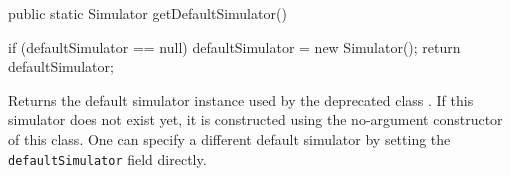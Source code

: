 \begin{code}

   public static Simulator getDefaultSimulator() \begin{hide} {
      if (defaultSimulator == null)
            defaultSimulator = new Simulator();
      return defaultSimulator;
   } \end{hide}
\end{code}
\begin{tabb} Returns the default simulator instance used by
  the deprecated class .
  If this simulator does not exist yet, it is constructed using the
  no-argument constructor of this class.
  One can specify a different default simulator by setting
  the \texttt{defaultSimulator} field directly.
\end{tabb}
\begin{code}\begin{hide}
}\end{hide}
\end{code}
